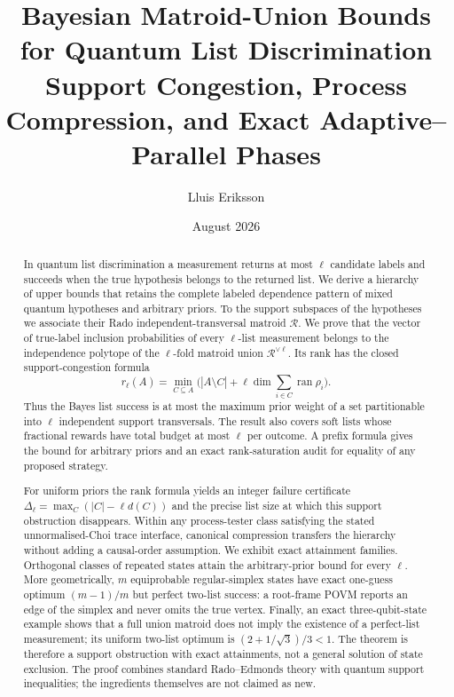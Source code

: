 \documentclass[11pt]{article}
\title{\textbf{Bayesian Matroid-Union Bounds for Quantum List Discrimination}\\
Support Congestion, Process Compression, and Exact Adaptive--Parallel Phases}
\author{Lluis Eriksson}
\date{August 2026}
\theoremstyle{definition}
\theoremstyle{remark}
\newcommand{\cR}{\mathcal R}
\newcommand{\ran}{\operatorname{ran}}
\begin{document}
\maketitle

\begin{abstract}
In quantum list discrimination a measurement returns at most $\ell$ candidate
labels and succeeds when the true hypothesis belongs to the returned list.
We derive a hierarchy of upper bounds that retains
the complete labeled dependence pattern of mixed quantum hypotheses and
arbitrary priors.  To the support subspaces of the hypotheses we associate
their Rado independent-transversal matroid $\cR$.  We prove that the vector of
true-label inclusion probabilities of every $\ell$-list measurement belongs
to the independence polytope of the $\ell$-fold matroid union
$\cR^{\vee\ell}$.  Its rank has the closed support-congestion formula
\[
 r_\ell(A)=\min_{C\subseteq A}\bigl(|A\setminus C|
                  +\ell\dim\sum_{i\in C}\ran\rho_i\bigr).
\]
Thus the Bayes list success is at most the maximum prior weight of a set
partitionable into $\ell$ independent support transversals.  The result also
covers soft lists whose fractional rewards have total budget at most $\ell$
per outcome.  A prefix formula gives the bound for arbitrary priors and an exact
rank-saturation audit for equality of any proposed strategy.

For uniform priors the rank formula yields an integer failure certificate
$\Delta_\ell=\max_C(|C|-\ell d(C))$ and the precise list size at which this
support obstruction disappears.  Within any process-tester class satisfying
the stated unnormalised-Choi trace interface, canonical compression transfers
the hierarchy without adding a causal-order assumption.  We exhibit exact
attainment families.  Orthogonal classes
of repeated states attain the arbitrary-prior bound for every $\ell$.
More geometrically, $m$ equiprobable regular-simplex states have exact
one-guess optimum $(m-1)/m$ but perfect two-list success: a root-frame POVM
reports an edge of the simplex and never omits the true vertex.  Finally, an
exact three-qubit-state example shows that a full union matroid does not imply
the existence of a perfect-list measurement; its uniform two-list optimum is
$(2+1/\sqrt3)/3<1$.  The theorem is therefore a
support obstruction with exact attainments, not a general solution of state
exclusion.  The proof
combines standard Rado--Edmonds theory with quantum support inequalities; the
ingredients themselves are not claimed as new.


\end{abstract}
\end{document}
